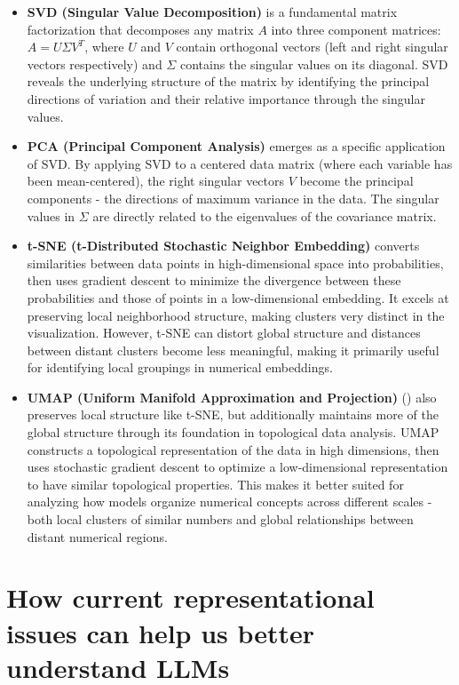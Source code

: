 \documentclass[
  a4paper, twoside, 10pt, titlepage]{book}
\begin{document}
\begin{itemize}
\item
  \textbf{SVD (Singular Value Decomposition)} is a fundamental matrix
  factorization that decomposes any matrix \(A\) into three component
  matrices: \(A = U\Sigma V^T\), where \(U\) and \(V\) contain
  orthogonal vectors (left and right singular vectors respectively) and
  \(\Sigma\) contains the singular values on its diagonal. SVD reveals
  the underlying structure of the matrix by identifying the principal
  directions of variation and their relative importance through the
  singular values.
\item
  \textbf{PCA (Principal Component Analysis)} emerges as a specific
  application of SVD. By applying SVD to a centered data matrix (where
  each variable has been mean-centered), the right singular vectors
  \(V\) become the principal components - the directions of maximum
  variance in the data. The singular values in \(\Sigma\) are directly
  related to the eigenvalues of the covariance matrix.
\item
  \textbf{t-SNE (t-Distributed Stochastic Neighbor Embedding)} converts
  similarities between data points in high-dimensional space into
  probabilities, then uses gradient descent to minimize the divergence
  between these probabilities and those of points in a low-dimensional
  embedding. It excels at preserving local neighborhood structure,
  making clusters very distinct in the visualization. However, t-SNE can
  distort global structure and distances between distant clusters become
  less meaningful, making it primarily useful for identifying local
  groupings in numerical embeddings.
\item
  \textbf{UMAP (Uniform Manifold Approximation and Projection)}
  () also preserves
  local structure like t-SNE, but additionally maintains more of the
  global structure through its foundation in topological data analysis.
  UMAP constructs a topological representation of the data in high
  dimensions, then uses stochastic gradient descent to optimize a
  low-dimensional representation to have similar topological properties.
  This makes it better suited for analyzing how models organize
  numerical concepts across different scales - both local clusters of
  similar numbers and global relationships between distant numerical
  regions.
\end{itemize}

\section{How current representational issues can help us better
understand
LLMs}\label{how-current-representational-issues-can-help-us-better-understand-llms}
\end{document}
